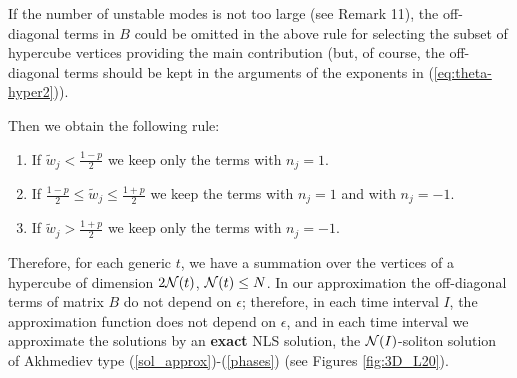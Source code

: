 \documentclass[12pt]{article}
\begin{document}
If the number of unstable modes is not too large (see Remark 11), the off-diagonal terms in $B$ could be omitted in the above rule for selecting the subset of  hypercube vertices providing the main contribution (but, of course, the off-diagonal terms should be kept in the arguments of the exponents in (\ref{eq:theta-hyper2})). 

Then we obtain the following rule:
\begin{enumerate}
\item If $\tilde w_j < \frac{1-p}{2}$ we keep only the terms with $n_j=1$.
\item If $\frac{1-p}{2}\le \tilde w_j \le \frac{1+p}{2}$ we keep the terms with $n_j=1$ and with $n_j=-1$.
\item If $\tilde w_j > \frac{1+p}{2}$ we keep only the terms with $n_j=-1$.
\end{enumerate}
Therefore, for each generic $t$, we have a summation over the vertices of a hypercube of dimension $2{\cal N}(t)$, ${\cal N}(t)\le N$. In our approximation the off-diagonal terms of matrix $B$ do not depend on $\epsilon$; therefore, in each time interval $I$, the approximation function does not depend on $\epsilon$, and in each time interval we approximate the solutions by an \textbf{exact} NLS solution, the ${\cal N}(I)$-soliton solution of Akhmediev type (\ref{sol_approx})-(\ref{phases}) (see Figures \ref{fig:3D_L20}).
\end{document}
